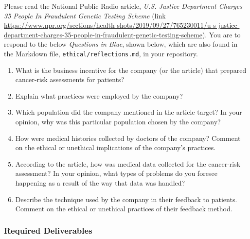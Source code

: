 Please read the National Public Radio article, \emph{U.S. Justice Department Charges 35 People In Fraudulent Genetic Testing Scheme} (link \url{https://www.npr.org/sections/health-shots/2019/09/27/765230011/u-s-justice-department-charges-35-people-in-fraudulent-genetic-testing-scheme}). You are to respond to the below \color{blue}\emph{Questions in Blue}\color{black}, shown below, which are also found in the Markdown file, {\tt ethical/reflections.md}, in your repository.

\color{blue}
	\begin{enumerate}
		\item What is the business incentive for the company (or the article) that prepared cancer-risk assessments for patients?

		\item Explain what practices were employed by the company?

		\item Which population did the company mentioned in the article target? In your opinion, why was this particular population chosen by the company?

		\item How were medical histories collected by doctors of the company? Comment on the ethical or unethical implications of the company's practices.

		\item According to the article, how was medical data collected for the cancer-risk assessment? In your opinion, what types of problems do you foresee happening as a result of the way that data was handled?

		\item Describe the technique used by the company in their feedback to patients. Comment on the ethical or unethical practices of their feedback method.
	\end{enumerate}
\color{black}

\vspace*{-.2in}
\subsubsection*{Required Deliverables}
\vspace*{-.1in}

